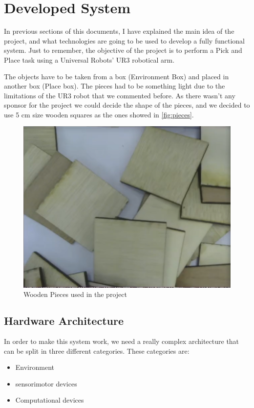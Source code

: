 \chapter{Developed System}

	In previous sections of this documents, I have explained the main idea of the project, and what technologies are going to be used to develop a fully functional system. Just to remember, the objective of the project is to perform a Pick and Place task using a Universal Robots' UR3 robotical arm.
	
	The objects have to be taken from a box (Environment Box) and placed in another box (Place box). The pieces had to be something light due to the limitations of the UR3 robot that we commented before. As there wasn't any sponsor for the project we could decide the shape of the pieces, and we decided to use 5 cm size wooden squares as the ones showed in \autoref{fig:pieces}.
	
	\begin{figure}[h]
		\centering
		\includegraphics[width=0.7\linewidth]{Images/pieces}
		\caption[pieces]{Wooden Pieces used in the project}
		\label{fig:pieces}
	\end{figure}
	
	\section{Hardware Architecture}
	
		In order to make this system work, we need a really complex architecture that can be split in three different categories. These categories are:
		
		\begin{itemize}
			\item[\textendash]Environment
			\item[\textendash]sensorimotor devices
			\item[\textendash]Computational devices
		\end{itemize}
	
